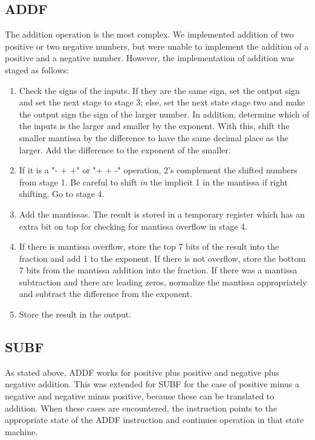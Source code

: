 \documentclass[conference]{IEEEtran}
\begin{document}
    \subsection{ADDF}
        The addition operation is the most complex. We implemented addition of two positive or two negative numbers, but were unable to implement the addition of a positive and a negative number. However, the implementation of addition was staged as follows:
        \begin{enumerate}
            \item Check the signs of the inputs. If they are the same sign, set the output sign and set the next stage to stage 3; else, set the next state stage two and make the output sign the sign of the larger number. In addition, determine which of the inputs is the larger and smaller by the exponent. With this, shift the smaller mantissa by the difference to have the same decimal place as the larger. Add the difference to the exponent of the smaller.
            \item If it is a "- + +" or "+ + -" operation, 2's complement the shifted numbers from stage 1. Be careful to shift \textit{in} the implicit 1 in the mantissa if right shifting. Go to stage 4. 
            \item Add the mantissas. The result is stored in a temporary register which has an extra bit on top for checking for mantissa overflow in stage 4.
            \item If there is mantissa overflow, store the top 7 bits of the result into the fraction and add 1 to the exponent. If there is not overflow, store the bottom 7 bits from the mantissa addition into the fraction. If there was a mantissa subtraction and there are leading zeros, normalize the mantissa appropriately and subtract the difference from the exponent. 
            \item Store the result in the output. 
        \end{enumerate}
    
    \subsection{SUBF}
        As stated above, ADDF works for positive plus positive and negative plus negative addition. This was extended for SUBF for the case of positive minus a negative and negative minus positive, because these can be translated to addition. When these cases are encountered, the instruction points to the appropriate state of the ADDF instruction and continues operation in that state machine.     
\end{document}
